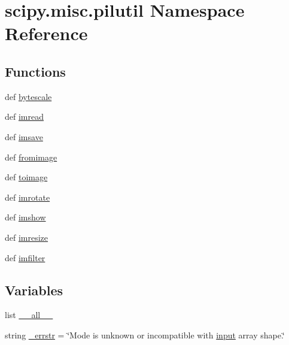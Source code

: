 \hypertarget{namespacescipy_1_1misc_1_1pilutil}{}\section{scipy.\+misc.\+pilutil Namespace Reference}
\label{namespacescipy_1_1misc_1_1pilutil}
\subsection*{Functions}
\begin{DoxyCompactItemize}
\item 
def \hyperlink{namespacescipy_1_1misc_1_1pilutil_a72e0567166cb354ede5017d329e30c2c}{bytescale}
\item 
def \hyperlink{namespacescipy_1_1misc_1_1pilutil_acd63381b4f3cc9ab2072777718d4c7fe}{imread}
\item 
def \hyperlink{namespacescipy_1_1misc_1_1pilutil_a60021f62692689e9a725284571b97e2b}{imsave}
\item 
def \hyperlink{namespacescipy_1_1misc_1_1pilutil_aa483bc6bacde6fd31611c8f8eb1942e7}{fromimage}
\item 
def \hyperlink{namespacescipy_1_1misc_1_1pilutil_a1d7efcbe99e45eb1612b0047047f228a}{toimage}
\item 
def \hyperlink{namespacescipy_1_1misc_1_1pilutil_af899d1a4ff633c17f0c2dfe472e5029c}{imrotate}
\item 
def \hyperlink{namespacescipy_1_1misc_1_1pilutil_abadc50d497e260e9cb16672ef750603c}{imshow}
\item 
def \hyperlink{namespacescipy_1_1misc_1_1pilutil_a597556283c373fe0968c5829397ea9d2}{imresize}
\item 
def \hyperlink{namespacescipy_1_1misc_1_1pilutil_a05a50a90e28eaac2565989a53eb2d604}{imfilter}
\end{DoxyCompactItemize}
\subsection*{Variables}
\begin{DoxyCompactItemize}
\item 
list \hyperlink{namespacescipy_1_1misc_1_1pilutil_a5023f2f629ba6f93e9c3c5e0a8f17816}{\+\_\+\+\_\+all\+\_\+\+\_\+}
\item 
string \hyperlink{namespacescipy_1_1misc_1_1pilutil_a269c47cd994f4df599a608942d524fc5}{\+\_\+errstr} = \char`\"{}Mode is unknown or incompatible with \hyperlink{constants_8h_a1a68120273996c880f8fd414afd17eb4}{input} array shape.\char`\"{}
\end{DoxyCompactItemize}


